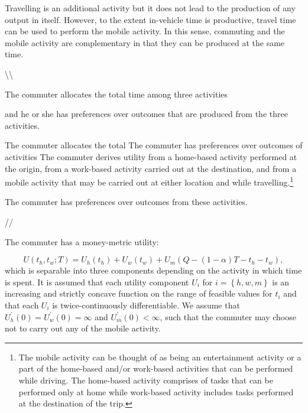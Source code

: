 \documentclass[12pt,a4paper,british]{article}
\theoremstyle{definition}
\theoremstyle{plain}
\theoremstyle{plain}
\begin{document}
Travelling is an additional activity but it does not lead to the production
of any output in itself. However, to the extent in-vehicle time is
productive, travel time can be used to perform the mobile activity.
In this sense, commuting and the mobile activity are complementary
in that they can be produced at the same time.

\textbackslash\textbackslash{}

The commuter allocates the total time among three activities

and he or she has preferences over outcomes that are produced from
the three activities.

The commuter allocates the total The commuter has preferences over
outcomes of activities The commuter derives utility from a home-based
activity performed at the origin, from a work-based activity carried
out at the destination, and from a mobile activity that may be carried
out at either location and while travelling.\footnote{The mobile activity can be thought of as being an entertainment activity
or a part of the home-based and/or work-based activities that can
be performed while driving. The home-based activity comprises of tasks
that can be performed only at home while work-based activity includes
tasks performed at the destination of the trip.}

The commuter has preferences over outcomes from these activities.

//

The commuter has a money-metric utility: %

{} 
\begin{equation}
U\left(t_{h},t_{w};T\right)=U_{h}\left(t_{h}\right)+U_{w}\left(t_{w}\right)+U_{m}\left(Q-\left(1-\alpha\right)T-t_{h}-t_{w}\right),\label{utility}
\end{equation}
which is separable into three components depending on the activity
in which time is spent. It is assumed that each utility component
$U_{i}$ for $i=\left\{ h,w,m\right\} $ is an increasing and strictly
concave function on the range of feasible values for $t_{i}$ and
that each $U_{i}$ is twice-continuously differentiable. We assume
that $U_{h}^{\prime}\left(0\right)=U_{w}^{\prime}\left(0\right)=\infty$
and $U_{m}^{\prime}\left(0\right)<\infty$, such that the commuter
may choose not to carry out any of the mobile activity.
\end{document}

